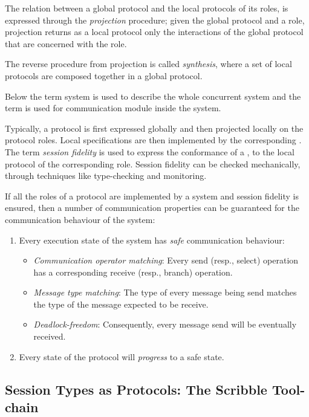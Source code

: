 The relation between a global protocol and the
local protocols of its roles, is expressed
through the {\em projection} procedure;
given the global protocol and a role, projection 
returns as a local protocol only the
interactions of the global protocol that are concerned with
the role.

The reverse procedure from projection is called {\em synthesis},
where a set of local protocols are composed together in a global
protocol.

Below the term system is used to describe the whole concurrent
system and the term  is used for communication module
inside the system.

Typically, a protocol is first expressed globally and then
projected locally on the protocol roles.
Local specifications are then implemented by the corresponding
.
The term {\em session fidelity} is used to express
the conformance of a , to the local protocol of the
corresponding role. Session fidelity can be checked mechanically,
through techniques like type-checking and monitoring.

If all the roles of a protocol are implemented by a
system and session fidelity is ensured,
then a number of communication properties can be guaranteed
for the communication behaviour of the system:
%
\begin{enumerate}[label=$\bullet$]
	\item	Every execution state of the system has {\em safe} communication behaviour:
	\begin{itemize}
		\item	{\em Communication operator matching}: Every send (resp., select) operation has a corresponding receive (resp., branch) operation.
		\item	{\em Message type matching}: The type of every message being send matches the type of the message expected to be receive.
		\item	{\em Deadlock-freedom}: Consequently, every message send will be eventually received.
	\end{itemize}
	
	\item	Every state of the protocol will {\em progress} to a safe state.
\end{enumerate}

\subsection{Session Types as Protocols: The Scribble Tool-chain}


